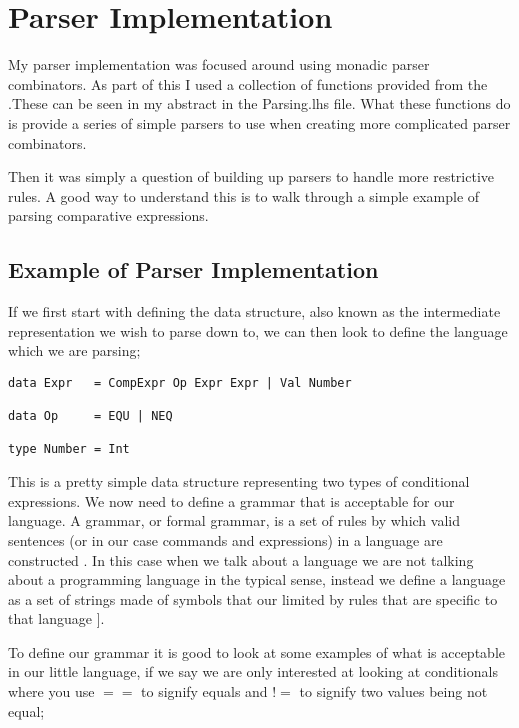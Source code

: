 \section{Parser Implementation}

My parser implementation was focused around using monadic parser combinators. As part of this I used a collection of functions provided from the \cite{Hutton98}.These can be seen in my abstract in the Parsing.lhs file. What these functions do is provide a series of simple parsers to use when creating more complicated parser combinators. 

Then it was simply a question of building up parsers to handle more restrictive rules. A good way to understand this is to walk through a simple example of parsing comparative expressions. 

\newpage

\subsection{Example of Parser Implementation}

If we first start with defining the data structure, also known as the intermediate representation we wish to parse down to, we can then look to define the language which we are parsing;

\begin{lstlisting}
data Expr 	= CompExpr Op Expr Expr | Val Number
	
data Op		= EQU | NEQ 
	
type Number	= Int 
\end{lstlisting}

This is a pretty simple data structure representing two types of conditional expressions. We now need to define a grammar that is acceptable for our language. A grammar, or formal grammar, is a set of rules by which valid sentences (or in our case commands and expressions) in a language are constructed \footnotemark[1].  In this case when we talk about a language we are not talking about a programming language in the typical sense, instead we define a language as a set of strings made of symbols that our limited by rules that are specific to that language \cite[p.~28]{IntroComp1990}]. 


To define our grammar it is good to look at some examples of what is acceptable in our little language, if we say we are only interested at looking at conditionals where you use $==$ to signify equals and $!=$ to signify two values being not equal;

